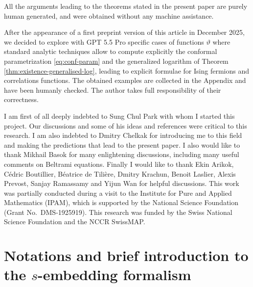 \documentclass[reqno]{amsart}
\numberwithin{equation}{section}
\theoremstyle{definition}
\theoremstyle{remark}
\begin{document}
 All the arguments leading to the theorems stated in the present paper are purely human generated, and were obtained without any machine assistance.

After the appearance of a first preprint version of this article in December 2025, we decided to explore with GPT 5.5 Pro specific cases of functions $\vartheta$ where standard analytic techniques allow to compute explicitly the conformal parametrization \eqref{eq:conf-param} and the generalized logarithm of Theorem  \ref{thm:existence-generalised-log}, leading to explicit formulae for Ising fermions and  correlations functions.
The obtained examples are collected in the Appendix and  have been humanly checked. The author takes full responsibility of their correctness.


  I am first of all deeply indebted to Sung Chul Park with whom I started this project. Our discussions and some of his ideas and references were critical to this research. I am also indebted to Dmitry Chelkak for introducing me to this field and making the predictions that lead to the present paper. I also would like to thank Mikhail Basok for many enlightening discussions, including many useful comments on Beltrami equations. Finally I would like to thank Ekin Arikok, Cédric Boutillier, Béatrice de Tilière, Dmitry Krachun, Benoit Laslier, Alexis Prevost, Sanjay Ramassamy and Yijun Wan for helpful discussions. This work was partially conducted during a visit to the Institute for Pure and Applied Mathematics (IPAM), which is supported by the National Science Foundation (Grant No.\ DMS-1925919). This research was funded by the Swiss National Science Foundation and the NCCR SwissMAP.

\section{Notations and brief introduction to the $s$-embedding formalism}\label{sec:notations}
\setcounter{equation}{0}
\end{document}
